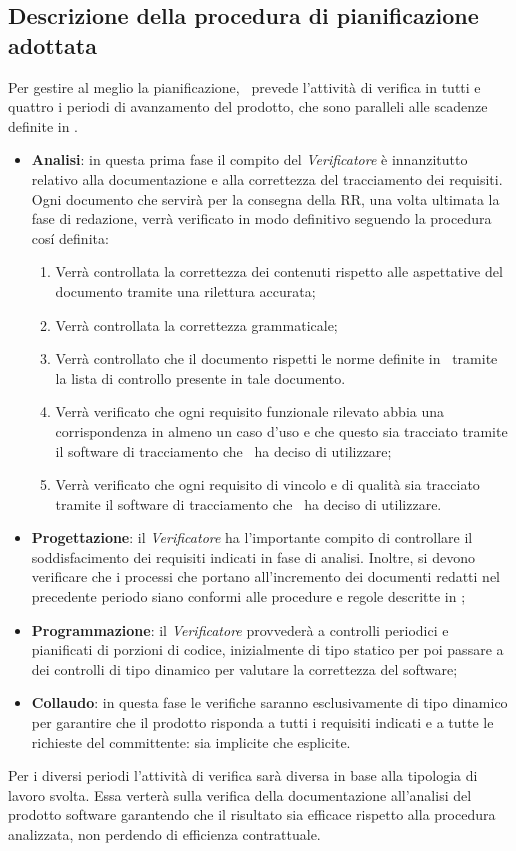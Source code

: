 \subsection{Descrizione della procedura di pianificazione adottata}
Per gestire al meglio la pianificazione, \gruppo ~prevede l'attività di verifica in tutti e quattro i periodi di avanzamento del prodotto, che sono paralleli alle scadenze definite in \infoPDP.
\begin{itemize}
\item \textbf{Analisi}: in questa prima fase il compito del \textit{Verificatore} è innanzitutto relativo alla documentazione e alla correttezza del tracciamento dei requisiti. Ogni documento che servirà per la consegna della RR, una volta ultimata la fase di redazione, verrà verificato in modo definitivo seguendo la procedura cos\'i definita:
\begin{enumerate}
\item Verrà controllata la correttezza dei contenuti rispetto alle aspettative del documento tramite una rilettura accurata;
\item Verrà controllata la correttezza grammaticale;
\item Verrà controllato che il documento rispetti le norme definite in \infoNDP ~tramite la lista di controllo presente in tale documento.
\item Verrà verificato che ogni requisito funzionale rilevato abbia una corrispondenza in almeno un caso d'uso e che questo sia tracciato tramite il software di tracciamento che \gruppo ~ha deciso di utilizzare;
\item Verrà verificato che ogni requisito di vincolo e di qualità sia tracciato tramite il software di tracciamento che \gruppo ~ha deciso di utilizzare.
\end{enumerate}
\item \textbf{Progettazione}: il \textit{Verificatore} ha l'importante compito di controllare il soddisfacimento dei requisiti indicati in fase di analisi. Inoltre, si devono verificare che i processi che portano all'incremento dei documenti redatti nel precedente periodo siano conformi alle procedure e regole descritte in \infoNDP;
\item \textbf{Programmazione}: il \textit{Verificatore} provvederà a controlli periodici e pianificati di porzioni di codice, inizialmente di tipo statico per poi passare a dei controlli di tipo dinamico per valutare la correttezza del software;
\item \textbf{Collaudo}: in questa fase le verifiche saranno esclusivamente di tipo dinamico per garantire che il prodotto risponda a tutti i requisiti indicati e a tutte le richieste del committente: sia implicite che esplicite.
\end{itemize}
Per i diversi periodi l'attività di verifica sarà diversa in base alla tipologia di lavoro svolta. Essa verterà sulla verifica della documentazione all'analisi del prodotto software garantendo che il risultato sia efficace rispetto alla procedura analizzata, non perdendo di efficienza contrattuale. 
